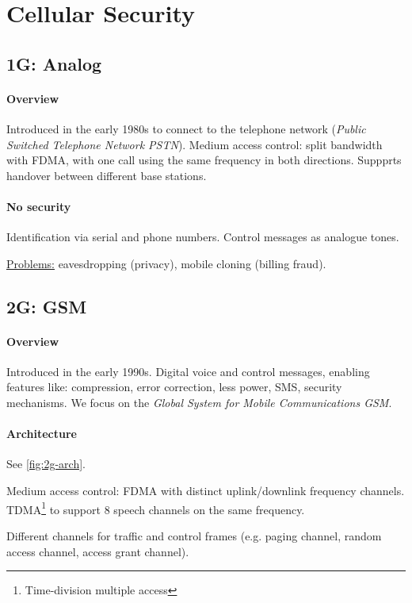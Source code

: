\section{Cellular Security}


\subsection{1G: Analog}

\paragraph{Overview}
Introduced in the early 1980s to connect to the telephone network (\textit{Public Switched Telephone Network PSTN}).
Medium access control: split bandwidth with FDMA, with one call using the same frequency in both directions.
Suppprts handover between different base stations.

\paragraph{No security}
Identification via serial and phone numbers.
Control messages as analogue tones.

\underline{Problems:} eavesdropping (privacy), mobile cloning (billing fraud).


\subsection{2G: GSM}

\paragraph{Overview}
Introduced in the early 1990s.
Digital voice and control messages, enabling features like: compression, error correction, less power, SMS, security mechanisms.
We focus on the \textit{Global System for Mobile Communications GSM}.

\paragraph{Architecture}
See \autoref{fig:2g-arch}.

Medium access control: FDMA with distinct uplink/downlink frequency channels.
TDMA\footnote{Time-division multiple access} to support 8 speech channels on the same frequency.

Different channels for traffic and control frames (e.g. paging channel, random access channel, access grant channel).

